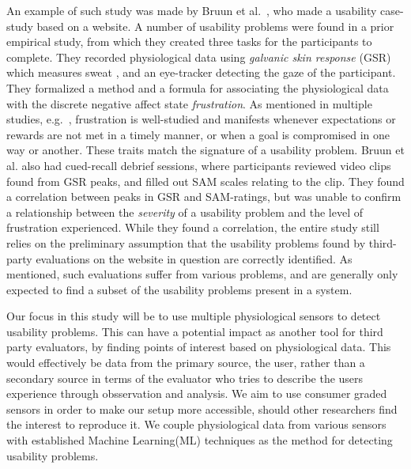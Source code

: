 An example of such study was made by Bruun et al.~\cite{LH-paper}, who made a usability case-study based on a website.
A number of usability problems were found in a prior empirical study, from which they created three tasks for the participants to complete.
They recorded physiological data using \textit{galvanic skin response} (GSR) which measures sweat \cite{gsr_calibration}, and an eye-tracker detecting the gaze of the participant.
They formalized a method and a formula for associating the physiological data with the discrete negative affect state \textit{frustration}.
As mentioned in multiple studies, e.g.~\cite{LH-paper,frustration_with_computers}, frustration is well-studied
and manifests whenever expectations or rewards are not met in a timely manner, or when a goal is compromised in one way or another.
These traits match the signature of a usability problem.
Bruun et al. also had cued-recall debrief sessions, where participants reviewed video clips found from GSR peaks, and filled out SAM scales relating to the clip. 
They found a correlation between peaks in GSR and SAM-ratings, but was unable to confirm a relationship between the
\textit{severity} of a usability problem and the level of frustration experienced.
While they found a correlation, the entire study still relies on the preliminary assumption that the usability problems found by
third-party evaluations on the website in question are correctly identified.
As mentioned, such evaluations suffer from various problems, and are generally only expected to find a subset of the usability problems present in a system. 

Our focus in this study will be to use multiple physiological sensors to detect usability problems.
This can have a potential impact as another tool for third party evaluators, by finding points of interest based on physiological data. 
This would effectively be data from the primary source, the user, rather than a secondary source in terms of the evaluator who tries to describe the users experience through obsservation and analysis. 
We aim to use consumer graded sensors in order to make our setup more accessible, should other researchers find the interest to reproduce
it. We couple physiological data from various sensors with established Machine Learning(ML) techniques as the method for
detecting usability problems.